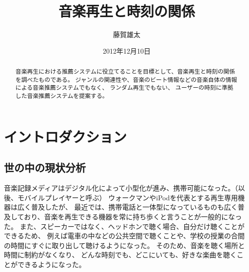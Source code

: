 \documentclass[11pt, twocolumn]{jsarticle}
\begin{document}
\title{音楽再生と時刻の関係}
\author{藤賀雄太}
\date{2012年12月10日}
\begin{abstract}
音楽再生における推薦システムに役立てることを目標として、音楽再生と時刻の関係を調べたものである。
ジャンルの関連性や、音楽のビート情報などの音楽自体の情報による音楽推薦システムでもなく、
ランダム再生でもない、
ユーザーの時刻に準拠した音楽推薦システムを提案する。
\end{abstract}
\maketitle
\tableofcontents


\section{イントロダクション}
\subsection{世の中の現状分析}
音楽記録メディアはデジタル化によって小型化が進み、携帯可能になった。（以後、モバイルプレイヤーと呼ぶ）
ウォークマンやiPodを代表とする再生専用機器は広く普及したが、
最近では、携帯電話と一体型になっているものも広く普及しており、音楽を再生できる機器を常に持ち歩くと言うことが一般的になった。
また、スピーカーではなく、ヘッドホンで聴く場合、自分だけ聴くことができるため、
例えば電車の中などの公共空間で聴くことや、学校の授業の合間の時間にすぐに取り出して聴けるようになった。
そのため、音楽を聴く場所と時間に制約がなくなり、
どんな時刻でも、どこにいても、好きな楽曲を聴くことができるようになった。
\end{document}
